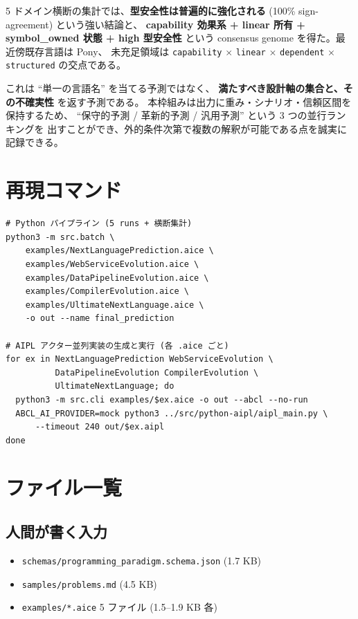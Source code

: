 \documentclass[a4paper,11pt]{article}
\begin{document}
5 ドメイン横断の集計では、{\bfseries 型安全性は普遍的に強化される}
(100\% sign-agreement) という強い結論と、
{\bfseries capability 効果系 + linear 所有 + symbol\_owned 状態 +
high 型安全性} という consensus genome を得た。最近傍既存言語は Pony、
未充足領域は \texttt{capability} \(\times\) \texttt{linear} \(\times\)
\texttt{dependent} \(\times\) \texttt{structured} の交点である。

これは ``単一の言語名'' を当てる予測ではなく、
{\bfseries 満たすべき設計軸の集合と、その不確実性} を返す予測である。
本枠組みは出力に重み・シナリオ・信頼区間を保持するため、
``保守的予測 / 革新的予測 / 汎用予測'' という 3 つの並行ランキングを
出すことができ、外的条件次第で複数の解釈が可能である点を誠実に
記録できる。

\appendix
\section{再現コマンド}

\begin{lstlisting}[caption={5 実験の一括実行と最終集計}]
# Python パイプライン (5 runs + 横断集計)
python3 -m src.batch \
    examples/NextLanguagePrediction.aice \
    examples/WebServiceEvolution.aice \
    examples/DataPipelineEvolution.aice \
    examples/CompilerEvolution.aice \
    examples/UltimateNextLanguage.aice \
    -o out --name final_prediction

# AIPL アクター並列実装の生成と実行 (各 .aice ごと)
for ex in NextLanguagePrediction WebServiceEvolution \
          DataPipelineEvolution CompilerEvolution \
          UltimateNextLanguage; do
  python3 -m src.cli examples/$ex.aice -o out --abcl --no-run
  ABCL_AI_PROVIDER=mock python3 ../src/python-aipl/aipl_main.py \
      --timeout 240 out/$ex.aipl
done
\end{lstlisting}

\section{ファイル一覧}

\subsection*{人間が書く入力}
\begin{itemize}
  \item \texttt{schemas/programming\_paradigm.schema.json} (1.7 KB)
  \item \texttt{samples/problems.md} (4.5 KB)
  \item \texttt{examples/*.aice} 5 ファイル (1.5--1.9 KB 各)
\end{itemize}
\end{document}
